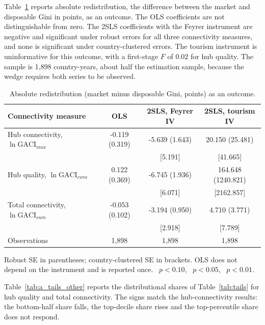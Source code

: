 Table~\ref{tab:a_absred} reports absolute redistribution, the difference between the market and disposable Gini in points, as an outcome. The OLS coefficients are not distinguishable from zero. The 2SLS coefficients with the Feyrer instrument are negative and significant under robust errors for all three connectivity measures, and none is significant under country-clustered errors. The tourism instrument is uninformative for this outcome, with a first-stage $F$ of $0.02$ for hub quality. The sample is 1,898 country-years, about half the estimation sample, because the wedge requires both series to be observed.

\begin{table}[H]\centering\caption{Absolute redistribution (market minus disposable Gini, points) as an outcome.}\label{tab:a_absred}
\begin{threeparttable}\small\begin{tabular}{lccc}
\toprule
Connectivity measure & OLS & 2SLS, Feyrer IV & 2SLS, tourism IV \\
\midrule
Hub connectivity, $\ln\mathrm{GACI}_{max}$ & -0.119 (0.319) & -5.639\sym{***} (1.643) & 20.150 (25.481) \\
 & & [5.191] & [41.665] \\
Hub quality, $\ln\mathrm{GACI}_{cwm}$ & 0.122 (0.369) & -6.745\sym{***} (1.936) & 164.648 (1240.821) \\
 & & [6.071] & [2162.857] \\
Total connectivity, $\ln\mathrm{GACI}_{sum}$ & -0.053 (0.102) & -3.194\sym{***} (0.950) & 4.710 (3.771) \\
 & & [2.918] & [7.789] \\
\midrule
Observations & 1,898 & 1,898 & 1,898 \\
\bottomrule
\end{tabular}
\begin{tablenotes}\footnotesize\item Robust SE in parentheses; country-clustered SE in brackets. OLS does not depend on the instrument and is reported once. \sym{*}~$p<0.10$, \sym{**}~$p<0.05$, \sym{***}~$p<0.01$.\end{tablenotes}\end{threeparttable}\end{table}

Table~\ref{tab:a_tails_other} reports the distributional shares of Table~\ref{tab:tails} for hub quality and total connectivity. The signs match the hub-connectivity results: the bottom-half share falls, the top-decile share rises and the top-percentile share does not respond.


